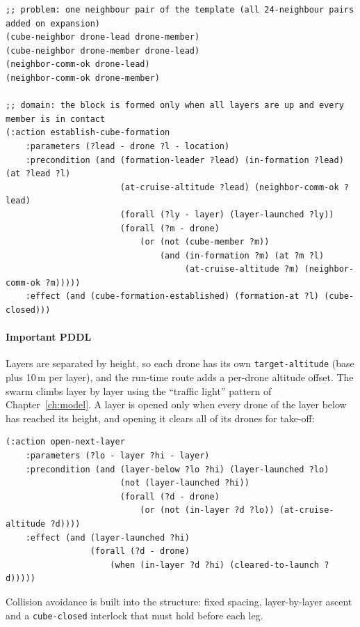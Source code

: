 \documentclass[11pt,a4paper,oneside]{report}
\newcommand{\code}[1]{\texttt{#1}}
\begin{document}
\begin{lstlisting}
;; problem: one neighbour pair of the template (all 24-neighbour pairs added on expansion)
(cube-neighbor drone-lead drone-member)
(cube-neighbor drone-member drone-lead)
(neighbor-comm-ok drone-lead)
(neighbor-comm-ok drone-member)

;; domain: the block is formed only when all layers are up and every member is in contact
(:action establish-cube-formation
    :parameters (?lead - drone ?l - location)
    :precondition (and (formation-leader ?lead) (in-formation ?lead) (at ?lead ?l)
                       (at-cruise-altitude ?lead) (neighbor-comm-ok ?lead)
                       (forall (?ly - layer) (layer-launched ?ly))
                       (forall (?m - drone)
                           (or (not (cube-member ?m))
                               (and (in-formation ?m) (at ?m ?l)
                                    (at-cruise-altitude ?m) (neighbor-comm-ok ?m)))))
    :effect (and (cube-formation-established) (formation-at ?l) (cube-closed)))
\end{lstlisting}

\paragraph{Important PDDL}
Layers are separated by height, so each drone has its own \code{target-altitude} (base plus
10\,m per layer), and the run-time route adds a per-drone altitude offset. The swarm climbs
layer by layer using the ``traffic light'' pattern of Chapter~\ref{ch:model}. A layer is opened
only when every drone of the layer below has reached its height, and opening it clears all of
its drones for take-off:

\begin{lstlisting}
(:action open-next-layer
    :parameters (?lo - layer ?hi - layer)
    :precondition (and (layer-below ?lo ?hi) (layer-launched ?lo)
                       (not (layer-launched ?hi))
                       (forall (?d - drone)
                           (or (not (in-layer ?d ?lo)) (at-cruise-altitude ?d))))
    :effect (and (layer-launched ?hi)
                 (forall (?d - drone)
                     (when (in-layer ?d ?hi) (cleared-to-launch ?d)))))
\end{lstlisting}

\noindent Collision avoidance is built into the structure: fixed spacing, layer-by-layer ascent
and a \code{cube-closed} interlock that must hold before each leg.
\end{document}

